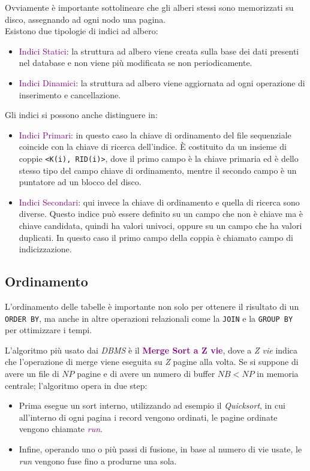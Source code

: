 Ovviamente è importante sottolineare che gli alberi stessi sono memorizzati su disco,
assegnando ad ogni nodo una pagina. \\

Esistono due tipologie di indici ad albero:
\begin{itemize}
    \item \textcolor{purple}{Indici Statici}: la struttura ad albero viene creata sulla
        base dei dati presenti nel database e non viene più modificata se non periodicamente.
    \item \textcolor{purple}{Indici Dinamici}: la struttura ad albero viene aggiornata ad
        ogni operazione di inserimento e cancellazione.
\end{itemize}

Gli indici si possono anche distinguere in:
\begin{itemize}
    \item \textcolor{purple}{Indici Primari}: in questo caso la chiave di ordinamento del
        file sequenziale coincide con la chiave di ricerca dell'indice. È costituito da un insieme
        di coppie \verb|<K(i), RID(i)>|, dove il primo campo è la chiave primaria ed è dello stesso tipo
        del campo chiave di ordinamento, mentre il secondo campo è un puntatore ad un blocco del disco.
    \item \textcolor{purple}{Indici Secondari}: qui invece la chiave di ordinamento e quella
        di ricerca sono diverse. Questo indice può essere definito su un
        campo che non è chiave ma è chiave candidata, quindi ha valori univoci, oppure su un campo
        che ha valori duplicati. In questo caso il primo campo della coppia è chiamato campo di indicizzazione.
\end{itemize}

\subsection{Ordinamento}

L'ordinamento delle tabelle è importante non solo per ottenere
il risultato di un \verb|ORDER BY|, ma anche in altre operazioni relazionali
come la \verb|JOIN| e la \verb|GROUP BY| per ottimizzare i tempi.

L'algoritmo più usato dai \emph{DBMS} è il \textbf{\textcolor{purple}{Merge Sort a Z vie}},
dove a \emph{Z vie} indica che l'operazione di merge viene eseguita su \emph{Z} pagine alla volta.
Se si suppone di avere un file di $NP$ pagine e di avere un numero di
buffer $NB < NP$ in memoria centrale; l'algoritmo opera in due step:
\begin{itemize}
    \item Prima esegue un sort interno, utilizzando ad esempio il \emph{Quicksort}, in cui all'interno di ogni pagina
        i record vengono ordinati, le pagine ordinate vengono chiamate \emph{\textcolor{purple}{run}}.
    \item Infine, operando uno o più passi di fusione, in base al numero di vie usate, le \emph{run} vengono fuse fino a produrne una sola.
\end{itemize}

